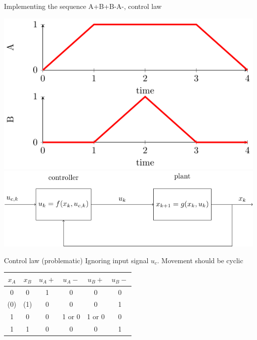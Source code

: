 \documentclass[presentation,aspectratio=1610]{beamer}
\begin{document}
\begin{frame}[label={sec:orgfa37bcd}]{Implementing the sequence A+B+B-A-, control law}
\begin{center}
\includegraphics[width=0.3\linewidth]{../figures/AplusBplusBminAmin}
\includegraphics[width=0.68\linewidth]{../figures/logic-control-loop}
\end{center}
\begin{block}{Control law (problematic)}
Ignoring input signal \(u_c\). Movement should be cyclic

\begin{center}
\begin{tabular}{|cc|cccc|}
\hline
\(x_A\) & \(x_B\) & \(u_A+\) & \(u_A-\) & \(u_B+\) & \(u_B-\)\\
\hline
0 & 0 & 1 & 0 & 0 & 0\\
(0) & (1) & 0 & 0 & 0 & 1\\
1 & 0 & 0 & 1 or 0 & 1 or 0 & 0\\
1 & 1 & 0 & 0 & 0 & 1\\
\hline
\end{tabular}
\end{center}
\end{block}
\end{frame}
\end{document}
